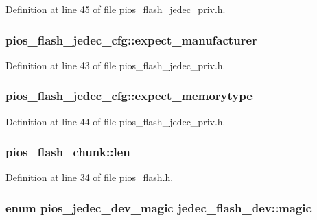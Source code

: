 Definition at line 45 of file pios\-\_\-flash\-\_\-jedec\-\_\-priv.\-h.

\hypertarget{group___p_i_o_s___f_l_a_s_h_gab7416f66a2c392cc5a27e12cbf4e9a07}{
\subsubsection[{expect\-\_\-manufacturer}]{ pios\-\_\-flash\-\_\-jedec\-\_\-cfg\-::expect\-\_\-manufacturer}}\label{group___p_i_o_s___f_l_a_s_h_gab7416f66a2c392cc5a27e12cbf4e9a07}


Definition at line 43 of file pios\-\_\-flash\-\_\-jedec\-\_\-priv.\-h.

\hypertarget{group___p_i_o_s___f_l_a_s_h_gacfb5714f6cef5d14a78a38ebe2369b43}{
\subsubsection[{expect\-\_\-memorytype}]{ pios\-\_\-flash\-\_\-jedec\-\_\-cfg\-::expect\-\_\-memorytype}}\label{group___p_i_o_s___f_l_a_s_h_gacfb5714f6cef5d14a78a38ebe2369b43}


Definition at line 44 of file pios\-\_\-flash\-\_\-jedec\-\_\-priv.\-h.

\hypertarget{group___p_i_o_s___f_l_a_s_h_ga127467a644fb34d50d9c074535dcaec3}{
\subsubsection[{len}]{ pios\-\_\-flash\-\_\-chunk\-::len}}\label{group___p_i_o_s___f_l_a_s_h_ga127467a644fb34d50d9c074535dcaec3}


Definition at line 34 of file pios\-\_\-flash.\-h.

\hypertarget{group___p_i_o_s___f_l_a_s_h_gaf71b8f686812a43a77983b3ec807aed7}{
\subsubsection[{magic}]{\setlength{\rightskip}{0pt plus 5cm}enum {\bf pios\-\_\-jedec\-\_\-dev\-\_\-magic} jedec\-\_\-flash\-\_\-dev\-::magic}}\label{group___p_i_o_s___f_l_a_s_h_gaf71b8f686812a43a77983b3ec807aed7}


